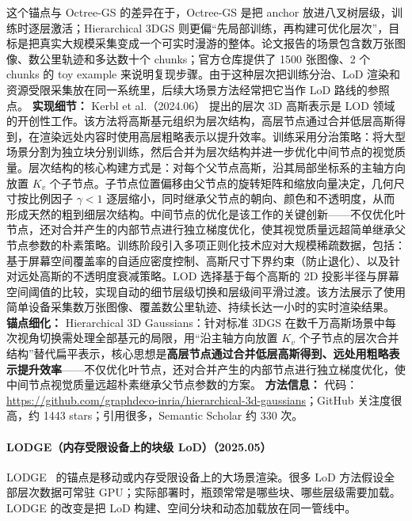 这个锚点与 Octree-GS 的差异在于，Octree-GS 是把 anchor 放进八叉树层级，训练时逐层激活；Hierarchical 3DGS 则更偏“先局部训练，再构建可优化层次”，目标是把真实大规模采集变成一个可实时漫游的整体。论文报告的场景包含数万张图像、数公里轨迹和多达数十个 chunks；官方仓库提供了 1500 张图像、2 个 chunks 的 toy example 来说明复现步骤。由于这种层次把训练分治、LoD 渲染和资源受限采集放在同一系统里，后续大场景方法经常把它当作 LoD 路线的参照点。
\textbf{实现细节：} Kerbl et al.（2024.06） 提出的层次 3D 高斯表示是 LOD 领域的开创性工作。该方法将高斯基元组织为层次结构，高层节点通过合并低层高斯得到，在渲染远处内容时使用高层粗略表示以提升效率。训练采用分治策略：将大型场景分割为独立块分别训练，然后合并为层次结构并进一步优化中间节点的视觉质量。层次结构的核心构建方式是：对每个父节点高斯，沿其局部坐标系的主轴方向放置 $K_v$ 个子节点。子节点位置偏移由父节点的旋转矩阵和缩放向量决定，几何尺寸按比例因子 $\gamma < 1$ 逐层缩小，同时继承父节点的朝向、颜色和不透明度，从而形成天然的粗到细层次结构。中间节点的优化是该工作的关键创新——不仅优化叶节点，还对合并产生的内部节点进行独立梯度优化，使其视觉质量远超简单继承父节点参数的朴素策略。训练阶段引入多项正则化技术应对大规模稀疏数据，包括：基于屏幕空间覆盖率的自适应密度控制、高斯尺寸下界约束（防止退化）、以及针对远处高斯的不透明度衰减策略。LOD 选择基于每个高斯的 2D 投影半径与屏幕空间阈值的比较，实现自动的细节层级切换和层级间平滑过渡。该方法展示了使用简单设备采集数万张图像、覆盖数公里轨迹、持续长达一小时的实时渲染结果。
\textbf{锚点细化：} Hierarchical 3D Gaussians：针对标准 3DGS 在数千万高斯场景中每次视角切换需处理全部基元的局限，用``沿主轴方向放置 $K_v$ 个子节点的层次合并结构''替代扁平表示，核心思想是\textbf{高层节点通过合并低层高斯得到、远处用粗略表示提升效率}——不仅优化叶节点，还对合并产生的内部节点进行独立梯度优化，使中间节点视觉质量远超朴素继承父节点参数的方案。
\textbf{方法信息：} 代码：\url{https://github.com/graphdeco-inria/hierarchical-3d-gaussians}；GitHub 关注度很高，约 1443 stars；引用很多，Semantic Scholar 约 330 次。



\paragraph{LODGE（内存受限设备上的块级 LoD）（2025.05）}
LODGE~\cite{2505_23158} 的锚点是移动或内存受限设备上的大场景渲染。很多 LoD 方法假设全部层次数据可常驻 GPU；实际部署时，瓶颈常常是哪些块、哪些层级需要加载。LODGE 的改变是把 LoD 构建、空间分块和动态加载放在同一管线中。

